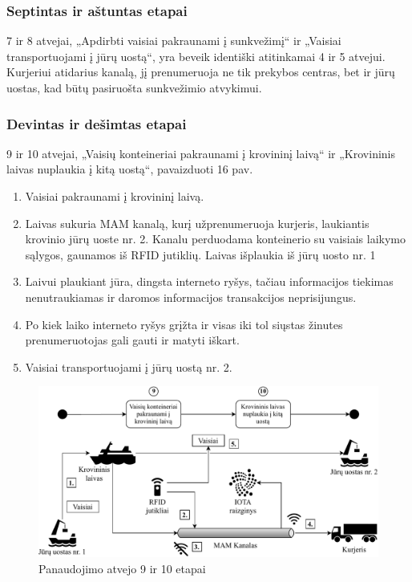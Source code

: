 
\subsubsection{Septintas ir aštuntas etapai}

7 ir 8 atvejai, „Apdirbti vaisiai pakraunami į sunkvežimį“ ir „Vaisiai transportuojami į jūrų uostą“, yra beveik identiški atitinkamai 4 ir 5 atvejui. Kurjeriui atidarius kanalą, jį prenumeruoja ne tik prekybos centras, bet ir jūrų uostas, kad būtų pasiruošta sunkvežimio atvykimui.




\subsubsection{Devintas ir dešimtas etapai}

9 ir 10 atvejai, „Vaisių konteineriai pakraunami į krovininį laivą“ ir „Krovininis laivas nuplaukia į kitą uostą“, pavaizduoti 16 pav.
\begin{enumerate}
    \item Vaisiai pakraunami į krovininį laivą.
    \item Laivas sukuria MAM kanalą, kurį užprenumeruoja kurjeris, laukiantis krovinio jūrų uoste nr. 2. Kanalu perduodama konteinerio su vaisiais laikymo sąlygos, gaunamos iš RFID jutiklių. Laivas išplaukia iš jūrų uosto nr. 1
    \item Laivui plaukiant jūra, dingsta interneto ryšys, tačiau informacijos tiekimas nenutraukiamas ir daromos informacijos transakcijos neprisijungus. 
    \item Po kiek laiko interneto ryšys grįžta ir visas iki tol siųstas žinutes prenumeruotojas gali gauti ir matyti iškart.
    \item Vaisiai transportuojami į jūrų uostą nr. 2.
\end{enumerate}

\begin{figure}[H]
    \centering
    \includegraphics[scale=0.7]{images/iota-usecase-9-10}
    \caption{Panaudojimo atvejo 9 ir 10 etapai}
\end{figure}



